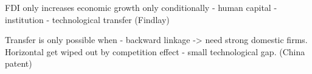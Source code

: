 FDI only increases economic growth only conditionally
- human capital
- institution
- technological transfer (Findlay)

Transfer is only possible when
- backward linkage -> need strong domestic firms. Horizontal get wiped out by competition effect
- small technological gap. (China patent)